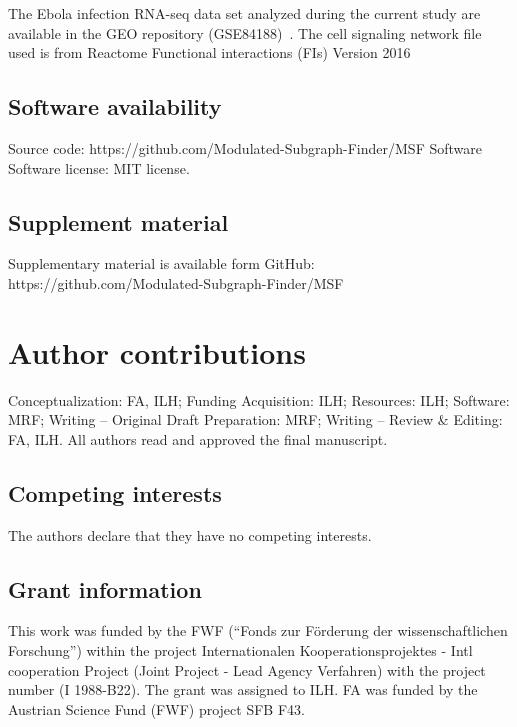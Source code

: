 \documentclass[10pt,a4paper,twocolumn]{article}
\begin{document}
	The Ebola infection RNA-seq data set analyzed during the current study are
	available in the GEO repository (GSE84188)~\cite{Olejnik}. The cell
	signaling network file used is from Reactome Functional interactions (FIs)
	Version 2016~\cite{Cytokegg}
	
	\subsection*{Software availability}
	
	\noindent
	Source code: \newline
	https://github.com/Modulated-Subgraph-Finder/MSF \newline Software
	Software license: MIT license.
	
	\subsection*{Supplement material}
	Supplementary material is available form GitHub: https://github.com/Modulated-Subgraph-Finder/MSF
	
	\section*{Author contributions}
	Conceptualization: FA, ILH; Funding Acquisition: ILH; Resources: ILH;
	Software: MRF; Writing – Original Draft Preparation: MRF; Writing – Review
	\& Editing: FA, ILH. All authors read and approved the final manuscript.
	
	\subsection*{Competing interests}
	
	The authors declare that they have no competing interests.
	
	\subsection*{Grant information}
	
	This work was funded by the FWF (“Fonds zur F{\"o}rderung der
	wissenschaftlichen Forschung”) within the project Internationalen
	Kooperationsprojektes - Intl cooperation Project (Joint Project - Lead
	Agency Verfahren) with the project number (I 1988-B22). The grant was
	assigned to ILH. FA was funded by the Austrian Science Fund (FWF) project
	SFB F43.
	
	
	{\small
		}
	
\end{document}
